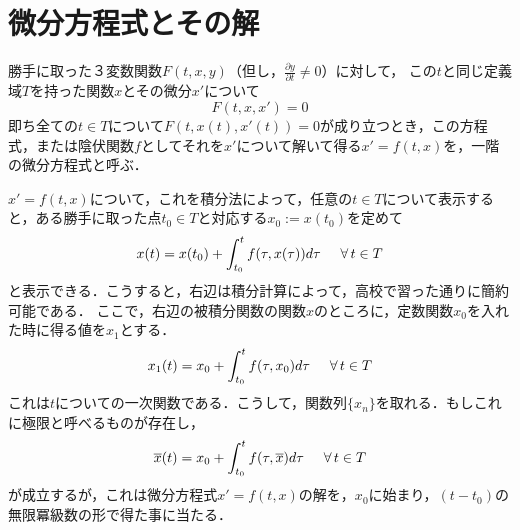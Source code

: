 \documentclass[uplatex,dvipdfmx]{jsreport}
\begin{document}
\section{微分方程式とその解}

\begin{definition}[一階微分方程式]
    勝手に取った３変数関数$F(t,x,y)$（但し，$\frac{\partial y}{\partial t}\ne 0$）に対して，
    この$t$と同じ定義域$T$を持った関数$x$とその微分$x'$について
    $$F(t,x,x') = 0$$
    即ち全ての$t\in T$について$F(t,x(t),x'(t))=0$が成り立つとき，この方程式，または陰伏関数$f$としてそれを$x'$について解いて得る$x' = f(t,x)$を，一階の微分方程式と呼ぶ．
\end{definition}

$x'=f(t,x)$について，これを積分法によって，任意の$t\in T$について表示すると，ある勝手に取った点$t_0\in T$と対応する$x_0:=x(t_0)$を定めて
\begin{equation}
    x(t) = x(t_0) + \int^t_{t_0}f(\tau,x(\tau))d\tau \hspace{5mm}\forall\, t\in T
\end{equation}
と表示できる．こうすると，右辺は積分計算によって，高校で習った通りに簡約可能である．
ここで，右辺の被積分関数の関数$x$のところに，定数関数$x_0$を入れた時に得る値を$x_1$とする．
\begin{equation}
    x_1(t) = x_0 + \int^t_{t_0}f(\tau, x_0)d\tau \hspace{5mm}\forall\, t\in T
\end{equation}
これは$t$についての一次関数である．こうして，関数列$\{x_n\}$を取れる．もしこれに極限と呼べるものが存在し，
\begin{equation}
    \overline{x}(t) = x_0 + \int^t_{t_0}f(\tau, \overline{x})d\tau \hspace{5mm}\forall\, t\in T
\end{equation}
が成立するが，これは微分方程式$x'=f(t,x)$の解を，$x_0$に始まり，$(t-t_0)$の無限冪級数の形で得た事に当たる．
\end{document}
